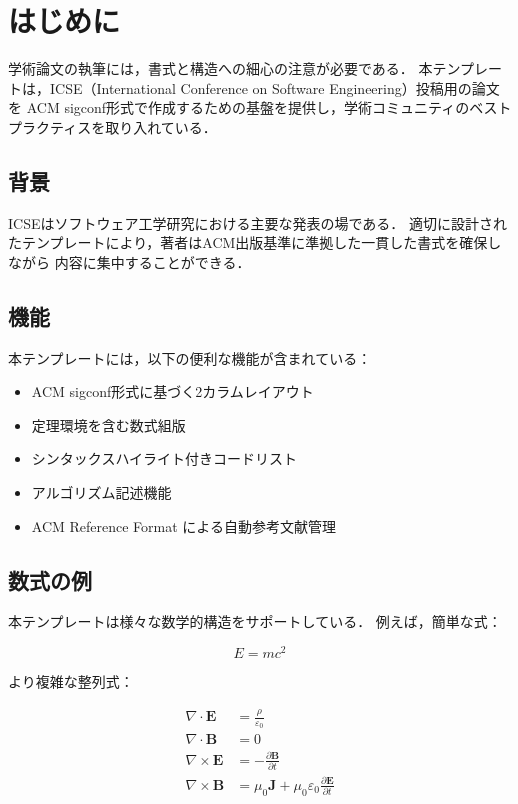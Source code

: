 
\section{はじめに}
\label{sec:introduction}

学術論文の執筆には，書式と構造への細心の注意が必要である．
本テンプレートは，ICSE（International Conference on Software Engineering）投稿用の論文を
ACM sigconf形式で作成するための基盤を提供し，学術コミュニティのベストプラクティスを取り入れている．

\subsection{背景}

ICSEはソフトウェア工学研究における主要な発表の場である．
適切に設計されたテンプレートにより，著者はACM出版基準に準拠した一貫した書式を確保しながら
内容に集中することができる．

\subsection{機能}

本テンプレートには，以下の便利な機能が含まれている：

\begin{itemize}
    \item ACM sigconf形式に基づく2カラムレイアウト
    \item 定理環境を含む数式組版
    \item シンタックスハイライト付きコードリスト
    \item アルゴリズム記述機能
    \item ACM Reference Format による自動参考文献管理
\end{itemize}

\subsection{数式の例}

本テンプレートは様々な数学的構造をサポートしている．
例えば，簡単な式：

\begin{equation}
    E = mc^2
    \label{eq:einstein}
\end{equation}

より複雑な整列式：

\begin{align}
    \nabla \cdot \mathbf{E} &= \frac{\rho}{\varepsilon_0} \\
    \nabla \cdot \mathbf{B} &= 0 \\
    \nabla \times \mathbf{E} &= -\frac{\partial \mathbf{B}}{\partial t} \\
    \nabla \times \mathbf{B} &= \mu_0 \mathbf{J} + \mu_0 \varepsilon_0 \frac{\partial \mathbf{E}}{\partial t}
\end{align}

